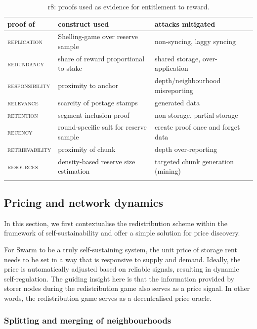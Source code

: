 \vskip20pt
{\small \begin{longtable}{l|p{}|p{}}
\toprule
 {proof of} & {construct used} & {attacks mitigated}\\\midrule
 \textsc{replication}& Shelling-game over reserve sample& non-syncing, laggy syncing\\
 \textsc{redundancy}& share of reward proportional to stake & shared storage, over-application\\
 \textsc{responsibility}& proximity to anchor & depth/neighbourhood misreporting \\
 \textsc{relevance}& scarcity of postage stamps & generated data \\
 \textsc{retention}& segment inclusion proof & non-storage, partial storage\\
 \textsc{recency}& round-specific salt for reserve sample & create proof once and forget data\\
 \textsc{retrievability}& proximity of chunk & depth over-reporting\\ 
 \textsc{resources}& density-based reserve size estimation & targeted chunk generation (mining) \\\bottomrule
  \caption[r8: proofs used as evidence for entitlement to reward]{r8: proofs used as evidence for entitlement to reward.}
\label{tab:gr8}
 \end{longtable}
 }


\subsection{Pricing and network dynamics}\label{sec:price-oracle}

In this section, we first contextualise the redistribution scheme within the framework of self-sustainability and offer a simple solution for price discovery.

For Swarm to be a truly self-sustaining system, the unit price of storage rent needs to be set in a way that is responsive to supply and demand. Ideally, the price is automatically adjusted based on reliable signals, resulting in dynamic self-regulation. The guiding insight here is that the information provided by storer nodes during the redistribution game also serves as a price signal. In other words, the redistribution game serves as a decentralised price oracle.



\subsubsection{Splitting and merging of neighbourhoods}

